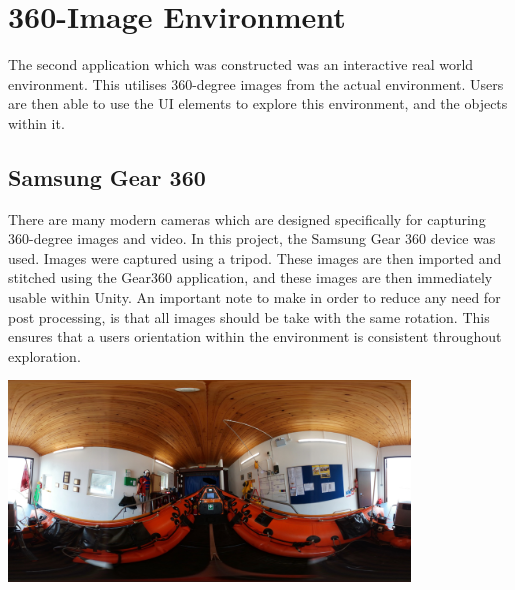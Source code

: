 \documentclass[ %
                    author={Elis Jones},
                supervisor={Dr. Kirsten Cater},
                    degree={BSc},
                     title={The Effect of Presentation Medium on Spatial Cognition},
                  subtitle={in the Virtual Environment},
                      year={2018} ]{dissertation}
\begin{document}
\section{360-Image Environment}
The second application which was constructed was an interactive real world environment. This utilises 360-degree images from the actual environment. Users are then able to use the UI elements to explore this environment, and the objects within it. 

\subsection{Samsung Gear 360}
There are many modern cameras which are designed specifically for capturing 360-degree images and video. In this project, the Samsung Gear 360 device was used. Images were captured using a tripod. These images are then imported and stitched using the Gear360 application, and these images are then immediately usable within Unity. An important note to make in order to reduce any need for post processing, is that all images should be take with the same rotation. This ensures that a users orientation within the environment is consistent throughout exploration. 

\begin{minipage}{\textwidth}
\hfill \break
\centering
\includegraphics[width=0.8\textwidth]{images/centre}
\label{model}
\hfill \break
\end{minipage}
\end{document}
